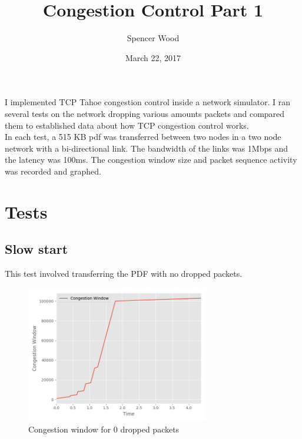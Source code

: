 \documentclass[fleqn,11pt]{article}
\begin{document}
\lstset{
  language=Python,
  basicstyle=\small,          %
  keywordstyle=\bfseries,
  identifierstyle=,           %
  commentstyle=,              %
  stringstyle=\ttfamily,      %
  showstringspaces=false,     %
  numbers=left,
  numberstyle=\tiny,
  numbersep=5pt,
  frame=tb,
}

\title{Congestion Control Part 1}

\author{Spencer Wood}

\date{March 22, 2017}

\maketitle


I implemented TCP Tahoe congestion control inside a network simulator. I ran
several tests on the network dropping various amounts packets and compared them
to established data about how TCP congestion control works.\\
\indent In each test, a 515 KB pdf was transferred between two nodes in a two node
network with a bi-directional link. The bandwidth of the links was 1Mbps and
the latency was 100ms. The congestion window size and packet sequence activity
was recorded and graphed.\\


\section{Tests}

\subsection{Slow start}

\indent\indent This test involved transferring the PDF with no dropped packets. 

\begin{figure}[!htb]
  \centering
  \includegraphics[width=8cm]{../graphs/0-cwnd.png}
  \caption{Congestion window for 0 dropped packets}
  \label{fig:throughput}
\end{figure}
\end{document}
